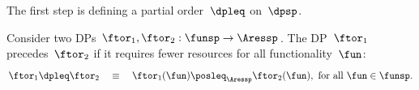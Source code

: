 The first step is defining a partial order~$\dpleq$ on~$\dpsp$.
\begin{definition}
Consider two DPs $\ftor_{1},\ftor_{2}:\funsp\rightarrow\Aressp$.
The DP~$\ftor_{1}$ precedes~$\ftor_{2}$ if it requires fewer resources
for all functionality~$\fun$:
\[
\ftor_{1}\dpleq\ftor_{2}\quad\equiv\quad\ftor_{1}(\fun)\posleq_{\Aressp}\ftor_{2}(\fun),\ \text{for all }\fun\in\funsp.
\]
\end{definition}

